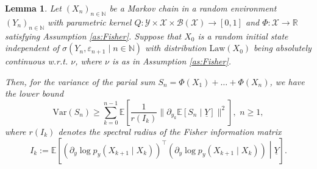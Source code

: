 \documentclass[a4paper,10pt]{article}
\newtheorem{lemma}[theorem]{Lemma}
\newcommand{\N}{\mathbb{N}}
\newcommand{\R}{\mathbb{R}}
\newcommand{\B}{\mathcal{B}}
\newcommand{\X}{\mathcal{X}}
\newcommand{\Y}{\mathcal{Y}}
\newcommand{\E}{\mathbb{E}}
\newcommand{\law}[1]{\text{Law}(#1)}
\newcommand{\eps}{\varepsilon}
\newcommand{\var}{\mathrm{Var}}
\newcommand{\ul}[1]{\underline{#1}}
\begin{document}
\begin{lemma}\label{lem:VarSn}
	Let $(X_n)_{n\in\N}$ be a Markov chain in a random environment $(Y_n)_{n\in\N}$ with parametric kernel
	$Q:\Y\times\X\times\B (\X)\to [0,1]$ and $\Phi:\X\to\R$ satisfying Assumption \ref{as:Fisher}. Suppose that $X_0$ is a random initial state independent of $\sigma (Y_n,\eps_{n+1}\mid n\in\N)$ with distribution $\law{X_0}$ being absolutely continuous w.r.t. $\nu$, where $\nu$ is as in Assumption \ref{as:Fisher}.
	
	Then, for the variance of the parial sum $S_n=\Phi (X_1)+\ldots+\Phi (X_n)$, we have the lower bound
	$$
	\var (S_n) \ge \sum_{k=0}^{n-1} \E \left[\frac{1}{r (I_k)}\lVert 	\partial_{y_k}\E \left[S_n\mid \ul{Y}\right]\rVert^2\right],\,\,n\ge 1,
	$$
	where $r(I_k)$ denotes the spectral radius of the Fisher information matrix
	$$
	I_k:=
	\E\left[\left(\partial_{y}\log p_y(X_{k+1}\mid X_{k})\right)^\top\left(\partial_{y}\log p_y(X_{k+1}\mid X_{k})\right)\middle| \ul{Y}\right].
	$$
\end{lemma}
\end{document}
